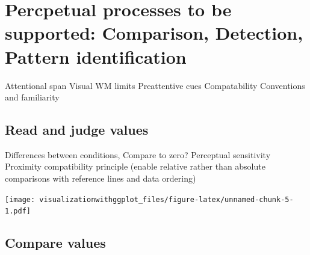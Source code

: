 \documentclass[]{krantz}
\makeatletter
\newenvironment{Shaded}{\begin{snugshade}}{\end{snugshade}}
\newcommand{\DataTypeTok}[1]{\textcolor[rgb]{0.13,0.29,0.53}{#1}}
\newcommand{\DecValTok}[1]{\textcolor[rgb]{0.00,0.00,0.81}{#1}}
\newcommand{\FloatTok}[1]{\textcolor[rgb]{0.00,0.00,0.81}{#1}}
\newcommand{\KeywordTok}[1]{\textcolor[rgb]{0.13,0.29,0.53}{\textbf{#1}}}
\newcommand{\NormalTok}[1]{#1}
\newcommand{\OperatorTok}[1]{\textcolor[rgb]{0.81,0.36,0.00}{\textbf{#1}}}
\newcommand{\StringTok}[1]{\textcolor[rgb]{0.31,0.60,0.02}{#1}}
\newenvironment{kframe}{%
\medskip{}
\setlength{\fboxsep}{.8em}
 \def\at@end@of@kframe{}%
 \ifinner\ifhmode%
  \def\at@end@of@kframe{\end{minipage}}%
  \begin{minipage}{\columnwidth}%
 \fi\fi%
 \def\FrameCommand##1{\hskip\@totalleftmargin \hskip-\fboxsep
 \colorbox{shadecolor}{##1}\hskip-\fboxsep
     \hskip-\linewidth \hskip-\@totalleftmargin \hskip\columnwidth}%
 \MakeFramed {\advance\hsize-\width
   \@totalleftmargin\z@ \linewidth\hsize
   \@setminipage}}%
 {\par\unskip\endMakeFramed%
 \at@end@of@kframe}
\renewenvironment{Shaded}{\begin{kframe}}{\end{kframe}}
\makeatother
\begin{document}
\hypertarget{percpetual-processes-to-be-supported-comparison-detection-pattern-identification}{%
\section{Percpetual processes to be supported: Comparison, Detection, Pattern identification}\label{percpetual-processes-to-be-supported-comparison-detection-pattern-identification}}

Attentional span
Visual WM limits
Preattentive cues
Compatability
Conventions and familiarity

\hypertarget{read-and-judge-values}{%
\subsection{Read and judge values}\label{read-and-judge-values}}

Differences between conditions, Compare to zero?
Perceptual sensitivity
Proximity compatibility principle (enable relative rather than absolute comparisons with reference lines and data ordering)

\begin{Shaded}
\end{Shaded}

\texttt{[image: visualizationwithggplot\_files/figure-latex/unnamed-chunk-5-1.pdf]}

\hypertarget{compare-values}{%
\subsection{Compare values}\label{compare-values}}
\end{document}
